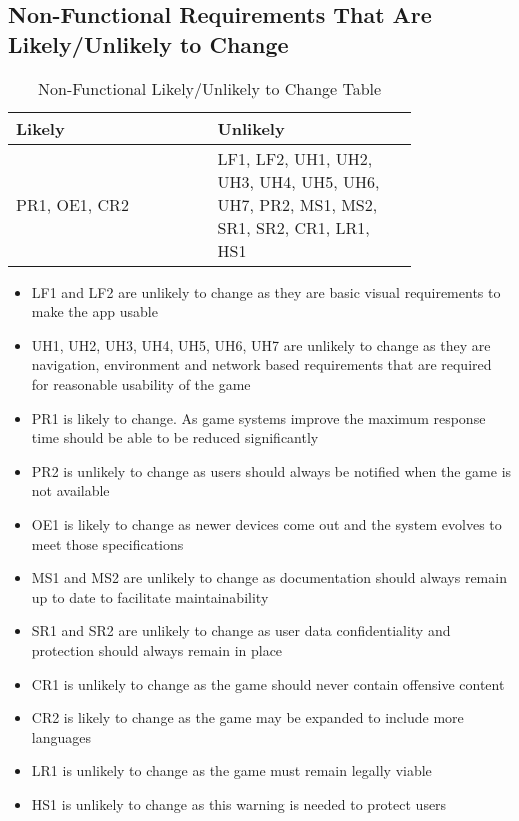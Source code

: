 \documentclass[12pt]{article}
\begin{document}
\subsection{Non-Functional Requirements That Are Likely/Unlikely to Change}
\begin{table}[h]
    \centering
    \begin{tabular}{|p{0.40\linewidth} | p{0.40\linewidth}|}
    \hline
         Likely & Unlikely \\
         \hline
         PR1, OE1, CR2 & LF1, LF2, UH1, UH2, UH3, UH4, UH5, UH6, UH7, PR2, MS1, MS2, SR1, SR2, CR1, LR1, HS1   \\
         \hline
    \end{tabular}
    \caption{Non-Functional Likely/Unlikely to Change Table}
    \label{tab:my_label2}
\end{table}
\begin{itemize}
    \item LF1 and LF2 are unlikely to change as they are basic visual requirements to make the app usable
    \item UH1, UH2, UH3, UH4, UH5, UH6, UH7 are unlikely to change as they are navigation, environment and network based requirements that are required for reasonable usability of the game
    \item PR1 is likely to change. As game systems improve the maximum response time should be able to be reduced significantly
    \item PR2 is unlikely to change as users should always be notified when the game is not available
    \item OE1 is likely to change as newer devices come out and the system evolves to meet those specifications
    \item MS1 and MS2 are unlikely to change as documentation should always remain up to date to facilitate maintainability
    \item SR1 and SR2 are unlikely to change as user data confidentiality and protection should always remain in place
    \item CR1 is unlikely to change as the game should never contain offensive content
    \item CR2 is likely to change as the game may be expanded to include more languages
    \item LR1 is unlikely to change as the game must remain legally viable
    \item HS1 is unlikely to change as this warning is needed to protect users
    
\end{itemize}
\end{document}

